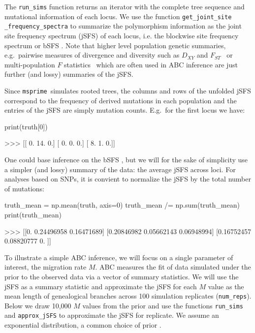 \documentclass[graybox]{svmult}
\newcommand{\msprime}[0]{\texttt{msprime}}
\begin{document}
    The \texttt{run\_sims} function returns an iterator with the complete
tree sequence and mutational information of each locus. We use the
function \texttt{get\_joint\_site} \texttt{\_frequency\_spectra} to summarize the
polymorphism information as the joint site frequency spectrum (jSFS) of
each locus, i.e. the blockwise site frequency spectrum
or bSFS \cite[sensu][]{Lohse2016}.
Note that higher level population genetic summaries, e.g.\ pairwise
measures of divergence and diversity such as \(D_{XY}\) \citep{Nei1972} and
\(F_{ST}\)~\citep{wright1950genetical} or multi-population \(F\)
statistics~\citep{Durand2009,patterson2012ancient} which are often
used in ABC inference are just further (and lossy) summaries of the jSFS.

Since \msprime\ simulates rooted trees, the columns and rows
of the unfolded jSFS correspond to the frequency of derived mutations in
each population and the entries of the jSFS are simply mutation counts.
E.g.\ for the first locus we have:
\begin{pythoncode}
print(truth[0])

>>> [[ 0.  14.  0.]
     [ 0.  0.  0.]
     [ 8.  1.  0.]]
\end{pythoncode}

    One could base inference on the bSFS \citep{Lohse2016, Beeravolu2017}, but we will for the sake of simplicity use a simpler (and lossy)
summary of the data: the average jSFS across loci. For analyses based on
SNPs, it is convient to normalize the jSFS by the total number of
mutations:
\begin{pythoncode}
truth_mean = np.mean(truth, axis=0)
truth_mean /= np.sum(truth_mean)
print(truth_mean)

>>> [[0.         0.24496958 0.16471689]
     [0.20846982 0.05662143 0.06948994]
     [0.16752457 0.08820777 0.        ]]
\end{pythoncode}

    To illustrate a simple ABC inference, we will focus on a single
parameter of interest, the migration rate \(M\).
ABC measures the fit of data simulated under the prior to the observed
data via a vector of summary statistics. We will use the jSFS as a
summary statistic and approximate the jSFS for each \(M\) value as the
mean length of genealogical branches across 100 simulation replicates (\texttt{num\_reps}). Below we
draw 10,000 \(M\) values from the prior and use the functions
\texttt{run\_sims} and \texttt{approx\_jSFS} to approximate the jSFS for
 replicate. We assume an exponential distribution, a common choice of prior \citep{hey2004multilocus}.
\end{document}
